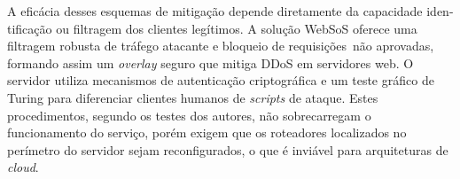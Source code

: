 
A eficácia desses esquemas de mitigação depende diretamente da capacidade iden-tificação ou filtragem dos clientes legítimos. 
%
A solução WebSoS \cite{Stavrou:2005:WOS:1090583.1648614} %
oferece uma filtragem robusta de tráfego atacante e bloqueio de requisições~não aprovadas, formando assim um \emph{overlay} seguro que mitiga DDoS em servidores web. O servidor utiliza mecanismos de autenticação criptográfica e um teste gráfico de Turing \cite{Dietrich00analyzingdistributed} para diferenciar clientes humanos de \emph{scripts} de ataque. Estes procedimentos, segundo os testes dos autores, não sobrecarregam o funcionamento do serviço, porém exigem que os roteadores localizados no perímetro do servidor sejam reconfigurados, o que é inviável para arquiteturas de \emph{cloud}.
